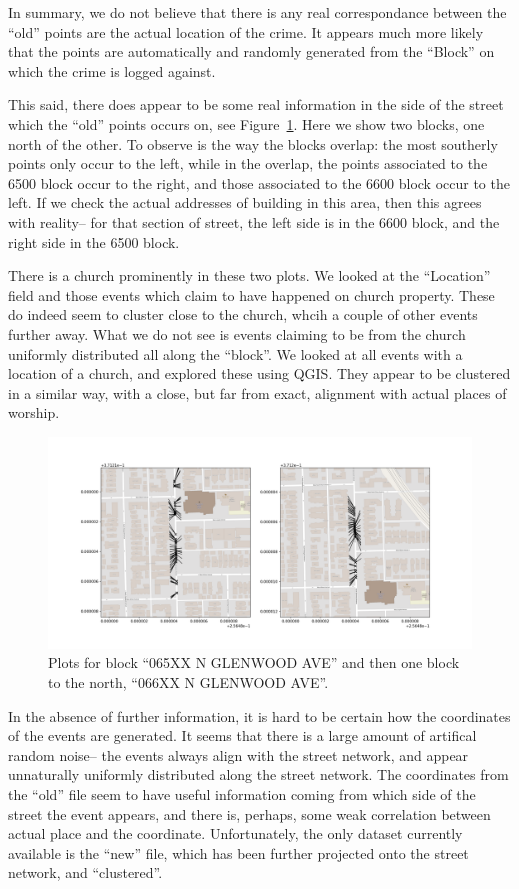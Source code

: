\documentclass[twoside,a4paper,twocolumn,10pt]{article}
\theoremstyle{plain}
\theoremstyle{definition}
\begin{document}
In summary, we do not believe that there is any real correspondance between the ``old'' points
are the actual location of the crime.  It appears much more likely that the points are
automatically and randomly generated from the ``Block'' on which the crime is logged against.

This said, there does appear to be some real information in the side of the street which the
``old'' points occurs on, see Figure~\ref{fig:four}.  Here we show two blocks, one north
of the other.  To observe is the way the blocks overlap: the most southerly points only
occur to the left, while in the overlap, the points associated to the 6500 block occur
to the right, and those associated to the 6600 block occur to the left.
If we check the actual addresses of building in this area, then this agrees with
reality-- for that section of street, the left side is in the 6600 block, and the right
side in the 6500 block.

There is a church prominently in these two plots.  We looked at the ``Location'' field
and those events which claim to have happened on church property.  These do indeed seem
to cluster close to the church, whcih a couple of other events further away.  What we
do not see is events claiming to be from the church uniformly distributed all along
the ``block''.  We looked at all events with a location of a church, and explored these
using QGIS.  They appear to be clustered in a similar way, with a close, but far from
exact, alignment with actual places of worship.

\begin{figure}
  \includegraphics[width=\textwidth]{Chicago_example2.png}
  \caption{Plots for block ``065XX N GLENWOOD AVE'' and then one block to the north,
``066XX N GLENWOOD AVE''.}
  \label{fig:four}
\end{figure}

In the absence of further information, it is hard to be certain how the coordinates of
the events are generated.  It seems that there is a large amount of artifical random
noise-- the events always align with the street network, and appear unnaturally uniformly
distributed along the street network.  The coordinates from the ``old'' file seem to
have useful information coming from which side of the street the event appears, and
there is, perhaps, some weak correlation between actual place and the coordinate.
Unfortunately, the only dataset currently available is the ``new'' file, which has
been further projected onto the street network, and ``clustered''.
\end{document}
